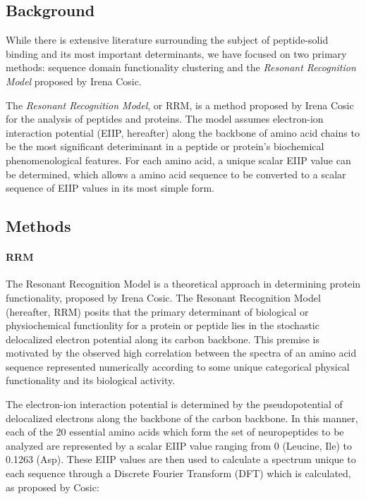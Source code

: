 \documentclass[]{article}
\let\oldparagraph\paragraph
\renewcommand{\paragraph}[1]{\oldparagraph{#1}\mbox{}}
\begin{document}
\hypertarget{background}{%
\subsection{Background}\label{background}}

While there is extensive literature surrounding the subject of peptide-solid binding and its most important determinants, we have focused on two primary methods: sequence domain functionality clustering and the \emph{Resonant Recognition Model} proposed by Irena Cosic.

The \emph{Resonant Recognition Model}, or RRM, is a method proposed by Irena Cosic for the analysis of peptides and proteins. The model assumes electron-ion interaction potential (EIIP, hereafter) along the backbone of amino acid chains to be the most significant deteriminant in a peptide or protein's biochemical phenomenological features. For each amino acid, a unique scalar EIIP value can be determined, which allows a amino acid sequence to be converted to a scalar sequence of EIIP values in its most simple form.

\hypertarget{methods}{%
\subsection{Methods}\label{methods}}

\hypertarget{rrm}{%
\paragraph{RRM}\label{rrm}}

The Resonant Recognition Model is a theoretical approach in determining protein functionality, proposed by Irena Cosic. The Resonant Recognition Model (hereafter, RRM) posits that the primary determinant of biological or physiochemical functionlity for a protein or peptide lies in the stochastic delocalized electron potential along its carbon backbone. This premise is motivated by the observed high correlation between the spectra of an amino acid sequence represented numerically according to some unique categorical physical functionality and its biological activity. 

The electron-ion interaction potential is determined by the pseudopotential of delocalized electrons along the backbone of the carbon backbone. In this manner, each of the 20 essential amino acids which form the set of neuropeptides to be analyzed are represented by a scalar EIIP value ranging from 0 (Leucine, Ile) to 0.1263 (Asp). These EIIP values are then used to calculate a spectrum unique to each sequence through a Discrete Fourier Transform (DFT) which is calculated, as proposed by Cosic:
\end{document}
